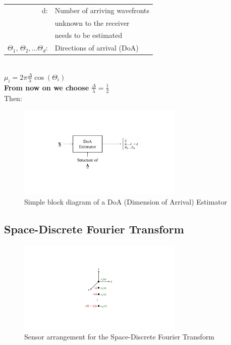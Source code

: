 \begin{doublespace}
\begin{tabular}{rl}
d: & Number of arriving wavefronts\\
 & unknown to the receiver\\
 & needs to be estimated\\
$\Theta_1,\,\Theta_2,\ldots\Theta_d$:& Directions of arrival (DoA)\\
\end{tabular}\\
$\mu_i=2\pi \frac{\Delta}{\lambda}\cos(\Theta_i)$\\
\textbf{From now on we choose} $\frac{\Delta}{\lambda}=\frac{1}{2}$\\
Then:\\
\begin{figure}[H]
	\centering
		\includegraphics[trim =4cm 5.5cm 4cm 4cm, clip,width=0.70\textwidth]{graphics/Block_diagram_DoA_estimator.pdf}
	\caption{Simple block diagram of a DoA (Dimension of Arrival) Estimator}
	\label{fig:Block_diagram_DoA_estimator}
\end{figure}
\end{doublespace}

\subsection{Space-Discrete Fourier Transform}
\begin{figure}[H]
	\centering
		\includegraphics[trim =6cm 4.5cm 6cm 4cm, clip, width=0.70\textwidth]{graphics/ULA_space-discrete_fourier_transform.pdf}
	\caption{Sensor arrangement for the Space-Discrete Fourier Transform}
	\label{fig:ULA_space-discrete_fourier_transform}
\end{figure}


